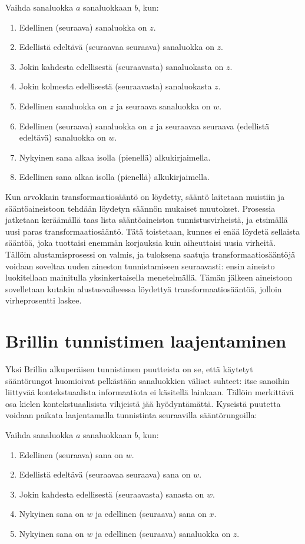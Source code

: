 \documentclass[utf8,bachelor,manualbib]{gradu3}
\begin{document}
Vaihda sanaluokka $a$ sanaluokkaan $b$, kun:

\begin{enumerate}
\item Edellinen (seuraava) sanaluokka on $z$.
\item Edellistä edeltävä (seuraavaa seuraava) sanaluokka on $z$. 
\item Jokin kahdesta edellisestä (seuraavasta) sanaluokasta on $z$.
\item Jokin kolmesta edellisestä (seuraavasta) sanaluokasta $z$.
\item Edellinen sanaluokka on $z$ ja seuraava sanaluokka on $w$.
\item Edellinen (seuraava) sanaluokka on $z$ ja seuraavaa seuraava (edellistä edeltävä) sanaluokka on $w$. 
\item Nykyinen sana alkaa isolla (pienellä) alkukirjaimella.
\item Edellinen sana alkaa isolla (pienellä) alkukirjaimella.
\end{enumerate}

Kun arvokkain transformaatiosääntö on löydetty, sääntö laitetaan muistiin ja sääntöaineistoon tehdään löydetyn säännön mukaiset muutokset. Prosessia jatketaan keräämällä taas lista sääntöaineiston tunnistusvirheistä, ja etsimällä uusi paras transformaatiosääntö. Tätä toistetaan, kunnes ei enää löydetä sellaista sääntöä, joka tuottaisi enemmän korjauksia kuin aiheuttaisi uusia virheitä. Tällöin alustamisprosessi on valmis, ja tuloksena saatuja transformaatiosääntöjä voidaan soveltaa uuden aineston tunnistamiseen seuraavasti: ensin aineisto luokitellaan mainitulla yksinkertaisella menetelmällä. Tämän jälkeen aineistoon sovelletaan kutakin alustusvaiheessa löydettyä transformaatiosääntöä, jolloin virheprosentti laskee. \citep{brill1992}

\section{Brillin tunnistimen laajentaminen}

Yksi Brillin alkuperäisen tunnistimen puutteista on se, että käytetyt sääntörungot huomioivat pelkästään sanaluokkien väliset suhteet: itse sanoihin liittyvää kontekstuaalista informaatiota ei käsitellä lainkaan. Tällöin merkittävä osa kielen kontekstuaalisista vihjeistä jää hyödyntämättä. Kyseistä puutetta voidaan paikata laajentamalla tunnistinta seuraavilla sääntörungoilla:

Vaihda sanaluokka $a$ sanaluokkaan $b$, kun:
\begin{enumerate}
\item Edellinen (seuraava) sana on $w$.
\item Edellistä edeltävä (seuraavaa seuraava) sana on $w$. 
\item Jokin kahdesta edellisestä (seuraavasta) sanasta on $w$.
\item Nykyinen sana on $w$ ja edellinen (seuraava) sana on $x$.
\item Nykyinen sana on $w$ ja edellinen (seuraava) sanaluokka on $z$.
\end{enumerate}
\end{document}

